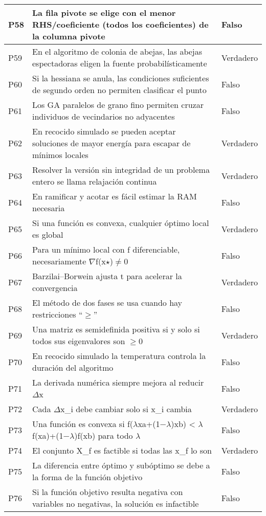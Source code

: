 \documentclass{article}
\begin{document}
\begin{longtable}{|p{1.5cm}|p{14cm}|p{2cm}|}
P58 & La fila pivote se elige con el menor RHS/coeficiente (todos los coeficientes) de la columna pivote & Falso \\ \hline
P59 & En el algoritmo de colonia de abejas, las abejas espectadoras eligen la fuente probabilísticamente & Verdadero \\ \hline
P60 & Si la hessiana se anula, las condiciones suficientes de segundo orden no permiten clasificar el punto & Falso \\ \hline
P61 & Los GA paralelos de grano fino permiten cruzar individuos de vecindarios no adyacentes & Falso \\ \hline
P62 & En recocido simulado se pueden aceptar soluciones de mayor energía para escapar de mínimos locales & Verdadero \\ \hline
P63 & Resolver la versión sin integridad de un problema entero se llama relajación continua & Verdadero \\ \hline
P64 & En ramificar y acotar es fácil estimar la RAM necesaria & Falso \\ \hline
P65 & Si una función es convexa, cualquier óptimo local es global & Verdadero \\ \hline
P66 & Para un mínimo local con f diferenciable, necesariamente $\nabla$f(x$\star$)$\neq$0 & Falso \\ \hline
P67 & Barzilai–Borwein ajusta t para acelerar la convergencia & Verdadero \\ \hline
P68 & El método de dos fases se usa cuando hay restricciones “$\geq$” & Falso \\ \hline
P69 & Una matriz es semidefinida positiva si y solo si todos sus eigenvalores son $\geq$0 & Verdadero \\ \hline
P70 & En recocido simulado la temperatura controla la duración del algoritmo & Falso \\ \hline
P71 & La derivada numérica siempre mejora al reducir $\Delta$x & Falso \\ \hline
P72 & Cada $\Delta$x\_i debe cambiar solo si x\_i cambia & Verdadero \\ \hline
P73 & Una función es convexa si f($\lambda$xa+(1−$\lambda$)xb) < $\lambda$f(xa)+(1−$\lambda$)f(xb) para todo $\lambda$ & Falso \\ \hline
P74 & El conjunto X\_f es factible si todas las x\_f lo son & Verdadero \\ \hline
P75 & La diferencia entre óptimo y subóptimo se debe a la forma de la función objetivo & Falso \\ \hline
P76 & Si la función objetivo resulta negativa con variables no negativas, la solución es infactible & Falso \\ \hline

\end{longtable}
\end{document}
